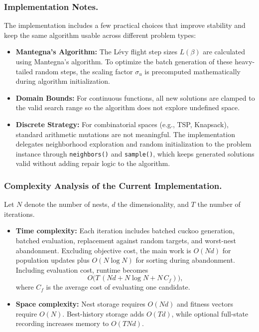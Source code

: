 \subsubsection{Implementation Notes.}
The implementation includes a few practical choices that improve stability and keep the same algorithm usable across different problem types:
\begin{itemize}
    \item \textbf{Mantegna's Algorithm:} The Lévy flight step sizes $L(\beta)$ are calculated using Mantegna's algorithm. To optimize the batch generation of these heavy-tailed random steps, the scaling factor $\sigma_u$ is precomputed mathematically during algorithm initialization.
  \item \textbf{Domain Bounds:} For continuous functions, all new solutions are clamped to the valid search range so the algorithm does not explore undefined space.
  \item \textbf{Discrete Strategy:} For combinatorial spaces (e.g., TSP, Knapsack), standard arithmetic mutations are not meaningful. The implementation delegates neighborhood exploration and random initialization to the problem instance through \texttt{neighbors()} and \texttt{sample()}, which keeps generated solutions valid without adding repair logic to the algorithm.
\end{itemize}

\subsubsection{Complexity Analysis of the Current Implementation.}
Let $N$ denote the number of nests, $d$ the dimensionality, and $T$ the number of iterations.
\begin{itemize}
  \item \textbf{Time complexity:} Each iteration includes batched cuckoo generation, batched evaluation, replacement against random targets, and worst-nest abandonment. Excluding objective cost, the main work is $O(Nd)$ for population updates plus $O(N \log N)$ for sorting during abandonment. Including evaluation cost, runtime becomes
  $$
  O\big(T\,(Nd + N\log N + N\,C_f)\big),
  $$
  where $C_f$ is the average cost of evaluating one candidate.
  \item \textbf{Space complexity:} Nest storage requires $O(Nd)$ and fitness vectors require $O(N)$. Best-history storage adds $O(Td)$, while optional full-state recording increases memory to $O(TNd)$.
\end{itemize}

